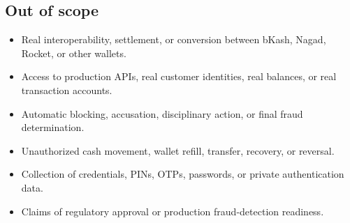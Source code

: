 \documentclass[11pt,a4paper]{article}
\begin{document}
\subsection*{Out of scope}
\begin{itemize}[noitemsep]
    \item Real interoperability, settlement, or conversion between bKash, Nagad, Rocket, or other wallets.
    \item Access to production APIs, real customer identities, real balances, or real transaction accounts.
    \item Automatic blocking, accusation, disciplinary action, or final fraud determination.
    \item Unauthorized cash movement, wallet refill, transfer, recovery, or reversal.
    \item Collection of credentials, PINs, OTPs, passwords, or private authentication data.
    \item Claims of regulatory approval or production fraud-detection readiness.
\end{itemize}
\end{document}
